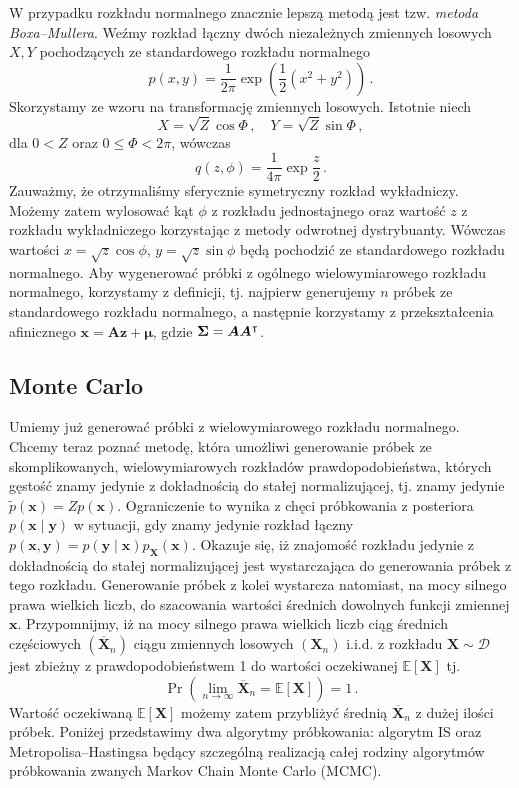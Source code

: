 \documentclass{myclass}
\begin{document}
W przypadku rozkładu normalnego znacznie lepszą metodą jest tzw. \emph{metoda Boxa--Mullera}. Weźmy
rozkład łączny dwóch niezależnych zmiennych losowych \(X, Y\) pochodzących ze standardowego rozkładu
normalnego
\[
p(x, y) = \frac{1}{2\pi}\exp(\frac{1}{2}(x^2 + y^2))\,.
\]
Skorzystamy ze wzoru na transformację zmiennych losowych. Istotnie niech
\[
X = \sqrt{Z} \cos \Phi\,,\quad Y = \sqrt{Z} \sin \Phi\,,
\]
dla \(0 < Z\) oraz \( 0 \leq \Phi < 2\pi\), wówczas
\[
q(z, \phi) = \frac{1}{4\pi}\exp\frac{z}{2}\,.
\]
Zauważmy, że otrzymaliśmy sferycznie symetryczny rozkład wykładniczy. Możemy zatem wylosować kąt
\(\phi\) z rozkładu jednostajnego oraz wartość \(z\) z rozkładu wykładniczego korzystając z metody
odwrotnej dystrybuanty. Wówczas wartości \(x = \sqrt{z}\cos\phi\), \(y = \sqrt{z}\sin\phi\) będą
pochodzić ze standardowego rozkładu normalnego. Aby wygenerować próbki z ogólnego wielowymiarowego
rozkładu normalnego, korzystamy z definicji, tj. najpierw generujemy \(n\) próbek ze standardowego
rozkładu normalnego, a następnie korzystamy z przekształcenia afinicznego \(\bm{x} = \bm{A}\bm{z} +
\bm{\mu}\), gdzie \(\bm{\Sigma} = \bm{A}\bm{A}^\intercal\).

\subsection{Monte Carlo}

Umiemy już generować próbki z wielowymiarowego rozkładu normalnego. Chcemy teraz poznać metodę,
która umożliwi generowanie próbek ze skomplikowanych, wielowymiarowych rozkładów prawdopodobieństwa,
których gęstość znamy jedynie z dokładnością do stałej normalizującej, tj. znamy jedynie
\(\tilde{p}(\bm{x}) = Z p(\bm{x})\). Ograniczenie to wynika z chęci próbkowania z posteriora
\(p(\bm{x} \mid \bm{y})\) w sytuacji, gdy znamy jedynie rozkład łączny \(p(\bm{x}, \bm{y}) =
p(\bm{y} \mid \bm{x}) p_{\bm{X}}(\bm{x})\). Okazuje się, iż znajomość rozkładu jedynie z
dokładnością do stałej normalizującej jest wystarczająca do generowania próbek z tego rozkładu.
Generowanie próbek z kolei wystarcza natomiast, na mocy silnego prawa wielkich liczb, do szacowania
wartości średnich dowolnych funkcji zmiennej \(\bm{x}\). Przypomnijmy, iż na mocy silnego prawa
wielkich liczb ciąg średnich częściowych \((\overline{\bm{X}}_n)\) ciągu zmiennych losowych
\((\bm{X}_n)\) i.i.d. z rozkładu \(\bm{X} \sim \mathcal{D}\) jest zbieżny z prawdopodobieństwem 1 do
wartości oczekiwanej \(\mathbb{E}[\bm{X}]\) tj.
\[
\Pr\left(\lim_{n \to \infty} \overline{\bm{X}}_n = \mathbb{E}[\bm{X}]\right) = 1\,.
\]
Wartość oczekiwaną \(\mathbb{E}[\bm{X}]\) możemy zatem przybliżyć średnią \(\overline{\bm{X}}_n\) z
dużej ilości próbek. Poniżej przedstawimy dwa algorytmy próbkowania: algorytm IS oraz
Metropolisa--Hastingsa będący szczególną realizacją całej rodziny algorytmów próbkowania zwanych
Markov Chain Monte Carlo (MCMC).
\end{document}
